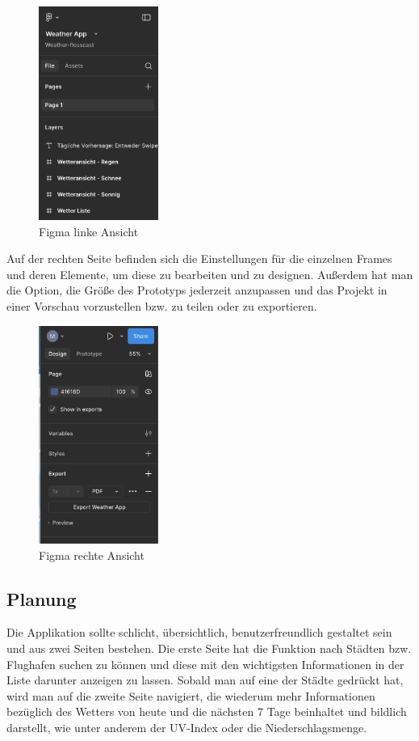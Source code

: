 \documentclass{article}
\begin{document}
\begin{figure}[ht]
\centering
\includegraphics[width=0.35\textwidth]{figma_1.png}
\caption{Figma linke Ansicht}
\end{figure}

Auf der rechten Seite befinden sich die Einstellungen für die einzelnen Frames und deren Elemente, um diese zu bearbeiten und zu designen. Außerdem hat man die Option, die Größe des Prototyps jederzeit anzupassen und das Projekt in einer Vorschau vorzustellen bzw. zu teilen oder zu exportieren.

\begin{figure}[H]
\centering
\includegraphics[width=0.35\textwidth]{figma_2.png}
\caption{Figma rechte Ansicht}
\end{figure}

\subsection{Planung}
Die Applikation sollte schlicht, übersichtlich, benutzerfreundlich
gestaltet sein und aus zwei Seiten bestehen. Die erste Seite hat die Funktion nach Städten bzw. Flughafen suchen zu können und diese mit den wichtigsten Informationen in der Liste darunter anzeigen zu lassen. Sobald man auf eine der Städte gedrückt hat, wird man auf die zweite Seite navigiert, die wiederum mehr Informationen bezüglich des Wetters von heute und die nächsten 7 Tage beinhaltet und bildlich darstellt, wie unter anderem der UV-Index oder die Niederschlagsmenge.
\end{document}

